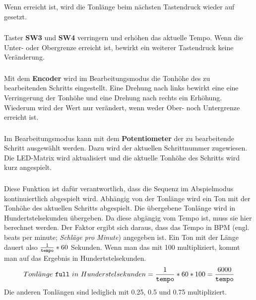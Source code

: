 \noindent Wenn  erreicht ist, wird die Tonlänge beim nächsten Tastendruck wieder auf  gesetzt.

\subsubsection{} %
\label{ssub:void_button_sw3_pressed}
Taster \textbf{SW3} und \textbf{SW4} verringern und erhöhen das aktuelle Tempo. Wenn die Unter- oder Obergrenze erreicht ist, bewirkt ein weiterer Tastendruck keine Veränderung.

\subsubsection{} %
\label{ssub:void_encoder_left&right}
Mit dem \textbf{Encoder} wird im Bearbeitungsmodus die Tonhöhe des zu bearbeitenden Schritts eingestellt. Eine Drehung nach links bewirkt eine eine Verringerung der Tonhöhe und eine Drehung nach rechts ein Erhöhung. Wiederum wird der Wert nur verändert, wenn weder Ober- noch Untergrenze erreicht ist.

\subsubsection{} %
\label{ssub:void_potentionmeter_turned}
Im Bearbeitungsmodus kann mit dem \textbf{Potentiometer} der zu bearbeitende Schritt ausgewählt werden. Dazu wird  der aktuellen Schrittnummer  zugewiesen. Die LED-Matrix wird aktualisiert und die aktuelle Tonhöhe des Schritts wird kurz angespielt.

\subsubsection{} %
\label{ssub:void_play_next_step}
Diese Funktion ist dafür verantwortlich, dass die Sequenz im Abspielmodus kontinuiertlich abgespielt wird. Abhängig von der Tonlänge wird ein Ton mit der Tonhöhe des aktuellen Schritts abgespielt. Die übergebene Tonlänge wird in Hundertstelsekunden übergeben. Da diese abgängig vom Tempo ist, muss sie hier berechnet werden. Der Faktor ergibt sich daraus, dass das Tempo in BPM (engl. beats per minute; \emph{Schläge pro Minute}) angegeben ist. Ein Ton mit der Länge  dauert also \(\frac{1}{\texttt{tempo}}*60\) Sekunden. Wenn man das mit 100 multipliziert, kommt man auf das Ergebnis in Hundertstelsekunden.
\[
Tonl\ddot{a}nge~\texttt{full}~in~Hunderstelsekunden=\frac{1}{\texttt{tempo}}*60*100=\frac{6000}{\texttt{tempo}}
\]
Die anderen Tonlängen sind lediglich mit 0.25, 0.5 und 0.75 multipliziert.\newline

